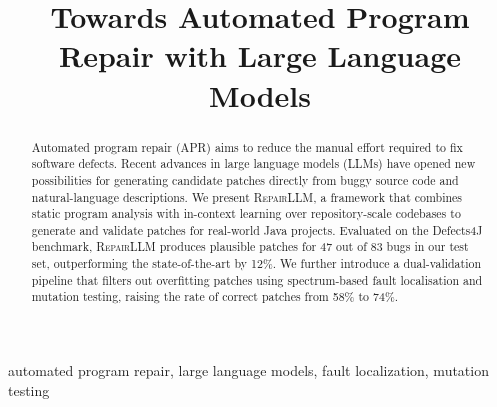 \documentclass[10pt,conference]{IEEEtran}
\begin{document}
\title{Towards Automated Program Repair with Large Language Models}

\author{
}


\maketitle

\noindent{}

\begin{abstract}
Automated program repair (APR) aims to reduce the manual effort required to fix software
defects. Recent advances in large language models (LLMs) have opened new possibilities for
generating candidate patches directly from buggy source code and natural-language
descriptions. We present \textsc{RepairLLM}, a framework that combines static program
analysis with in-context learning over repository-scale codebases to generate and validate
patches for real-world Java projects. Evaluated on the Defects4J benchmark,
\textsc{RepairLLM} produces plausible patches for 47 out of 83 bugs in our test set,
outperforming the state-of-the-art by 12\%. We further introduce a dual-validation pipeline
that filters out overfitting patches using spectrum-based fault localisation and mutation
testing, raising the rate of correct patches from 58\% to 74\%.
\end{abstract}

\begin{IEEEkeywords}
automated program repair, large language models, fault localization, mutation testing
\end{IEEEkeywords}









\end{document}
